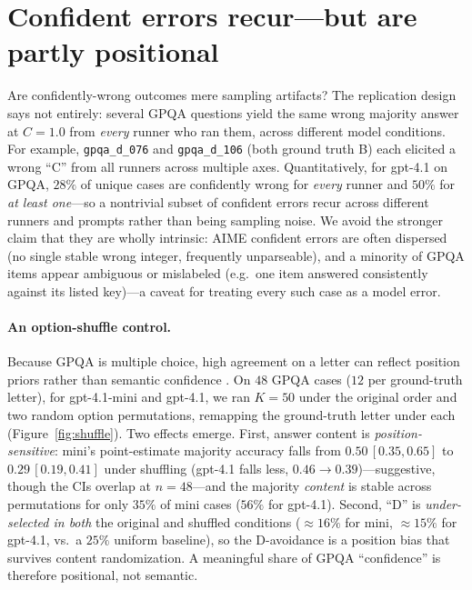 \documentclass[11pt]{article}
\newcommand{\C}{\textit{C}}
\begin{document}
\section{Confident errors recur---but are partly positional}
\label{sec:intrinsic}
Are confidently-wrong outcomes mere sampling artifacts? The replication design says not entirely:
several GPQA questions yield the same wrong majority answer at $\C{=}1.0$ from \emph{every} runner who
ran them, across different model conditions. For example, \texttt{gpqa\_d\_076} and
\texttt{gpqa\_d\_106} (both ground truth B) each elicited a wrong ``C'' from all runners across
multiple axes. Quantitatively, for gpt-4.1 on GPQA, $28\%$ of unique cases are confidently wrong for
\emph{every} runner and $50\%$ for \emph{at least one}---so a nontrivial subset of confident errors
recur across different runners and prompts rather than being sampling noise. We avoid the stronger
claim that they are wholly intrinsic: AIME confident errors are often dispersed (no single stable
wrong integer, frequently unparseable), and a minority of GPQA items appear ambiguous or mislabeled
(e.g.\ one item answered consistently against its listed key)---a caveat for treating every such case
as a model error.

\paragraph{An option-shuffle control.} Because GPQA is multiple choice, high agreement on a letter can
reflect position priors rather than semantic confidence \citep{zheng2024mcq,wei2024selection}. On $48$
GPQA cases ($12$ per ground-truth letter), for gpt-4.1-mini and gpt-4.1, we ran $K{=}50$ under the
original order and two random option permutations, remapping the ground-truth letter under each
(Figure~\ref{fig:shuffle}). Two effects emerge. First, answer content is \emph{position-sensitive}: mini's point-estimate
majority accuracy falls from $0.50\,[0.35,0.65]$ to $0.29\,[0.19,0.41]$ under shuffling (gpt-4.1 falls
less, $0.46{\to}0.39$)---suggestive, though the CIs overlap at $n{=}48$---and the majority \emph{content}
is stable across permutations for only $35\%$ of mini cases ($56\%$ for gpt-4.1). Second, ``D'' is
\emph{under-selected in both} the original and shuffled conditions ($\approx$$16\%$ for mini,
$\approx$$15\%$ for gpt-4.1, vs.\ a $25\%$ uniform baseline), so the D-avoidance is a position bias that
survives content randomization. A
meaningful share of GPQA ``confidence'' is therefore positional, not semantic.
\end{document}
